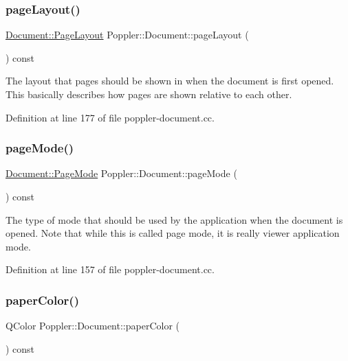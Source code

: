 \subsubsection{\texorpdfstring{page\+Layout()}{pageLayout()}}
{\footnotesize\ttfamily \hyperlink{class_poppler_1_1_document_a27b1574f15e09ae08b7acf7cc98f3fbd}{Document\+::\+Page\+Layout} Poppler\+::\+Document\+::page\+Layout (\begin{DoxyParamCaption}{ }\end{DoxyParamCaption}) const}

The layout that pages should be shown in when the document is first opened. This basically describes how pages are shown relative to each other. 

Definition at line 177 of file poppler-\/document.\+cc.

\mbox{\label{class_poppler_1_1_document_a9dd899cd7515f97320994c2a24cee316}} 
\subsubsection{\texorpdfstring{page\+Mode()}{pageMode()}}
{\footnotesize\ttfamily \hyperlink{class_poppler_1_1_document_a7157091ddc85f62b02cfc35a08c4822b}{Document\+::\+Page\+Mode} Poppler\+::\+Document\+::page\+Mode (\begin{DoxyParamCaption}{ }\end{DoxyParamCaption}) const}

The type of mode that should be used by the application when the document is opened. Note that while this is called page mode, it is really viewer application mode. 

Definition at line 157 of file poppler-\/document.\+cc.

\mbox{\label{class_poppler_1_1_document_adb81a852324b3a581826c184f154d4ef}} 
\subsubsection{\texorpdfstring{paper\+Color()}{paperColor()}}
{\footnotesize\ttfamily Q\+Color Poppler\+::\+Document\+::paper\+Color (\begin{DoxyParamCaption}{ }\end{DoxyParamCaption}) const}

